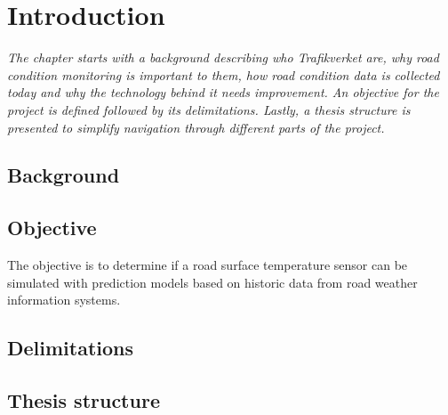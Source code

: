 \chapter{Introduction}
\emph{The chapter starts with a background describing who Trafikverket are, why road condition monitoring is important to them, how road condition data is collected today and why the technology behind it needs improvement. An objective for the project is defined followed by its delimitations. Lastly, a thesis structure is presented to simplify navigation through different parts of the project.}

\section{Background}


\section{Objective}
	The objective is to determine if a road surface temperature sensor can be simulated with prediction models based on historic data from road weather information systems.
\section{Delimitations}

\section{Thesis structure}

